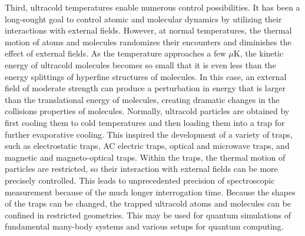 Third, ultracold temperatures enable numerous control possibilities. It has been a long-sought goal to control atomic and 
molecular dynamics by utilizing their interactions with external fields. However, at normal temperatures, the thermal 
motion of atoms and molecules randomizes their encounters and diminishes the effect of external fields. As the temperature
approaches a few $\mu$K, the kinetic energy of ultracold molecules becomes so small  that it is even less than 
the energy splittings of hyperfine structures of molecules. In this case, an external field of moderate strength can produce a perturbation
in energy that is larger than the translational energy of molecules, creating dramatic changes in the collisions properties of
molecules\cite{krems2005}. Normally, ultracold particles are obtained by first cooling them to cold temperatures and then loading them into a trap for further evaporative cooling\cite{metcalf1999}. 
This inspired the development of a variety of 
traps, such as electrostatic traps\cite{bethlem2000}, AC electric traps\cite{vanVeldhoven2005}, optical and microwave
traps\cite{optical-lattice-review, deMille2004}, and magnetic and magneto-optical traps\cite{hogan2008, 
vanhaecke2002, wang2004}. Within the traps, the thermal motion of particles are restricted, so their
interaction with external fields can be more precisely controlled. This leads to unprecedented precision of 
spectroscopic measurement because of the much longer  interrogation time\cite{vandeMeerakker2005, 
gilijamse2007, campbell2008}. Because the shapes of the traps can be changed, the trapped ultracold atoms and 
molecules can be confined in restricted geometries. This may be used for quantum simulations of 
fundamental many-body systems\cite{Baranov2012} and various setups for quantum computing\cite{brennen1999,
jaksch1999, pachos2003, kay2004, micheli2006, buchler2007a, bloch2008}.  


